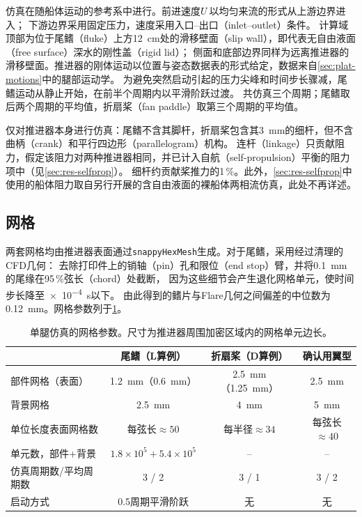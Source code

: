 仿真在随船体运动的参考系中进行。前进速度$U$以均匀来流的形式从上游边界进入；
下游边界采用固定压力，速度采用入口--出口（inlet--outlet）条件。
计算域顶部为位于尾鳍（fluke）上方\SI{12}{\centi\metre}处的滑移壁面（slip wall），即代表无自由液面（free surface）深水的刚性盖（rigid lid）；
侧面和底部边界同样为远离推进器的滑移壁面。推进器的刚体运动以位置与姿态数据表的形式给定，数据来自\cref{sec:plat-motions}中的腿部运动学。
为避免突然启动引起的压力尖峰和时间步长骤减，尾鳍运动从静止开始，在前半个周期内以平滑阶跃过渡。
共仿真三个周期；尾鳍取后两个周期的平均值，折扇桨（fan paddle）取第三个周期的平均值。

仅对推进器本身进行仿真：尾鳍不含其脚杆，折扇桨包含其\SI{3}{\milli\metre}的细杆，但不含曲柄（crank）和平行四边形（parallelogram）机构。
连杆（linkage）只贡献阻力，假定该阻力对两种推进器相同，并已计入自航（self-propulsion）平衡的阻力项中（见\cref{sec:res-selfprop}）。
细杆约贡献桨推力的1\,\%。此外，\cref{sec:res-selfprop}中使用的船体阻力取自另行开展的含自由液面的裸船体两相流仿真，此处不再详述。

\subsection{网格}

两套网格均由推进器表面通过\texttt{snappyHexMesh}生成。对于尾鳍，采用经过清理的CFD几何：
去除打印件上的销轴（pin）孔和限位（end stop）臂，并将\SI{0.1}{\milli\metre}的尾缘在95\,\%弦长（chord）处截断，
因为这些细节会产生退化网格单元，使时间步长降至\SI{e-4}{\second}以下。
由此得到的鳍片与Flare几何之间偏差的中位数为\SI{0.12}{\milli\metre}。网格参数列于\cref{tab:meshes}。

\begin{table}[t]
  \centering
  \caption[网格参数]{单腿仿真的网格参数。尺寸为推进器周围加密区域内的网格单元边长。}
  \label{tab:meshes}
  \small
  \begin{tabular}{@{}lccc@{}}
    \toprule
    & 尾鳍（L算例） & 折扇桨（D算例） & 确认用翼型 \\
    \midrule
    部件网格（表面） & \SI{1.2}{\milli\metre}（\SI{0.6}{\milli\metre}） & \SI{2.5}{\milli\metre}（\SI{1.25}{\milli\metre}） & \SI{2.5}{\milli\metre} \\
    背景网格 & \SI{2.5}{\milli\metre} & \SI{4}{\milli\metre} & \SI{5}{\milli\metre} \\
    单位长度表面网格数 & 每弦长$\approx50$ & 每半径$\approx34$ & 每弦长$\approx40$ \\
    单元数，部件+背景 & $1.8\times10^5+5.4\times10^5$ & -- & -- \\
    仿真周期数/平均周期数 & 3 / 2 & 3 / 1 & 3 / 2 \\
    启动方式 & 0.5周期平滑阶跃 & 无 & 无 \\
    \bottomrule
  \end{tabular}
\end{table}

